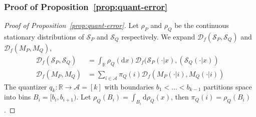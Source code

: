 \documentclass{article}
\theoremstyle{plain}
\theoremstyle{definition}
\theoremstyle{remark}
\begin{document}
 \subsubsection{Proof of Proposition~\ref{prop:quant-error}}\label{sec:proof-quant-error}
\begin{proof}[Proof of Proposition~\ref{prop:quant-error}]
    Let $\rho_P$ and $\rho_Q$ be the continuous stationary distributions of $\mathcal{S}_P$ and $\mathcal{S}_Q$ respectively. We expand $\mathcal{D}_f(\mathcal{S}_P,\mathcal{S}_Q)$ and $\mathcal{D}_f(M_P,M_Q)$,
    \begin{align}
    \mathcal{D}_f(\mathcal{S}_P,\mathcal{S}_Q) &= \int_{\mathbb{R}}\rho_Q(\text{d}x) \mathcal{D}_f (\mathcal{S}_P(\cdot|x),(\mathcal{S}_Q(\cdot|x))\\
        \mathcal{D}_f(M_P,M_Q) &= \sum_{i\in \mathcal{A}} \pi_Q(i) \mathcal{D}_f(M_P(\cdot|i),M_Q(\cdot|i))
    \end{align}
     The quantizer $q_k: \mathbb{R}\rightarrow \mathcal{A}=[k]$ with boundaries $b_1<\dots <b_{k-1}$ partitions space into bins $B_i=[b_i,b_{i+1})$. Let $\rho_Q(B_i)=\int_{B_i}\text{d}\rho_Q(x)$, then $\pi_Q(i)=\rho_Q(B_i)$.


\end{proof}
\end{document}
